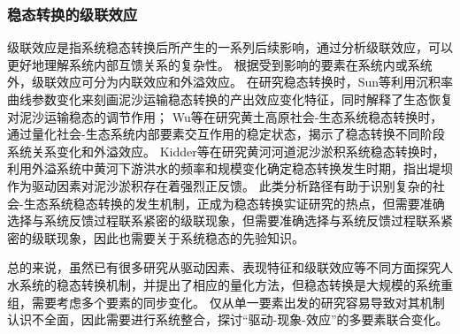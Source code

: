 \subsubsection*{稳态转换的级联效应}

级联效应是指系统稳态转换后所产生的一系列后续影响，通过分析级联效应，可以更好地理解系统内部互馈关系的复杂性。
根据受到影响的要素在系统内或系统外，级联效应可分为内联效应和外溢效应\cite{rocha2018}。
在研究稳态转换时，Sun等利用沉积率曲线参数变化来刻画泥沙运输稳态转换的产出效应变化特征，同时解释了生态恢复对泥沙运输稳态的调节作用\cite{sun2020}；
Wu等在研究黄土高原社会-生态系统稳态转换时，通过量化社会-生态系统内部要素交互作用的稳定状态，揭示了稳态转换不同阶段系统关系变化和外溢效应\cite{wu2020a}。
Kidder等在研究黄河河道泥沙淤积系统稳态转换时，利用外溢系统中黄河下游洪水的频率和规模变化确定稳态转换发生时期，指出堤坝作为驱动因素对泥沙淤积存在着强烈正反馈\cite{kidder2015}。
此类分析路径有助于识别复杂的社会-生态系统稳态转换的发生机制，正成为稳态转换实证研究的热点，但需要准确选择与系统反馈过程联系紧密的级联现象，但需要准确选择与系统反馈过程联系紧密的级联现象，因此也需要关于系统稳态的先验知识。

总的来说，虽然已有很多研究从驱动因素、表现特征和级联效应等不同方面探究人水系统的稳态转换机制，并提出了相应的量化方法，但稳态转换是大规模的系统重组，需要考虑多个要素的同步变化。
仅从单一要素出发的研究容易导致对其机制认识不全面，因此需要进行系统整合，探讨“驱动-现象-效应”的多要素联合变化。
